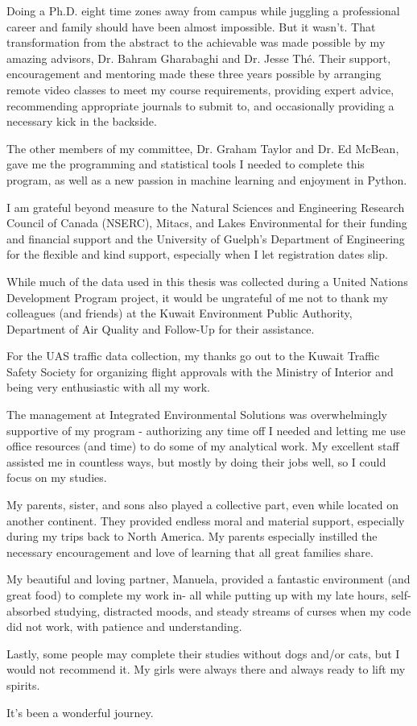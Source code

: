 \begin{acknowledgements}\label{acknow}

Doing a Ph.D. eight time zones away from campus while juggling a professional career and family should have been almost impossible. But it wasn't. That transformation from the abstract to the achievable was made possible by my amazing advisors, Dr. Bahram Gharabaghi and Dr. Jesse Th\'e. Their support, encouragement and mentoring made these three years possible by arranging remote video classes to meet my course requirements, providing expert advice, recommending appropriate journals to submit to, and occasionally providing a necessary kick in the backside.

The other members of my committee, Dr. Graham Taylor and Dr. Ed McBean, gave me the programming and statistical tools I needed to complete this program, as well as a new passion in machine learning and enjoyment in Python.

I am grateful beyond measure to the Natural Sciences and Engineering Research Council of Canada (NSERC), Mitacs, and Lakes Environmental for their funding and financial support and the University of Guelph's Department of Engineering for the flexible and kind support, especially when I let registration dates slip.

While much of the data used in this thesis was collected during a United Nations Development Program project, it would be ungrateful of me not to thank my colleagues (and friends) at the Kuwait Environment Public Authority, Department of Air Quality and Follow-Up for their assistance.

For the UAS traffic data collection, my thanks go out to the Kuwait Traffic Safety Society for organizing flight approvals with the Ministry of Interior and being very enthusiastic with all my work.

The management at Integrated Environmental Solutions was overwhelmingly supportive of my program - authorizing any time off I needed and letting me use office resources (and time) to do some of my analytical work. My excellent staff assisted me in countless ways, but mostly by doing their jobs well, so I could focus on my studies.

My parents, sister, and sons also played a collective part, even while located on another continent. They provided endless moral and material support, especially during my trips back to North America. My parents especially instilled the necessary encouragement and love of learning that all great families share.

My beautiful and loving partner, Manuela, provided a fantastic environment (and great food) to complete my work in- all while putting up with my late hours, self-absorbed studying, distracted moods, and steady streams of curses when my code did not work, with patience and understanding.

Lastly, some people may complete their studies without dogs and/or cats, but I would not recommend it. My girls were always there and always ready to lift my spirits.

It's been a wonderful journey.

\end{acknowledgements}
